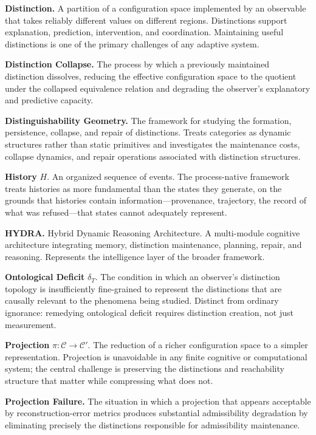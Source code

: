 \documentclass[11pt, oneside]{book}
\theoremstyle{definition}
\theoremstyle{remark}
\begin{document}
\textbf{Distinction.} A partition of a configuration space implemented by an observable that takes reliably different values on different regions. Distinctions support explanation, prediction, intervention, and coordination. Maintaining useful distinctions is one of the primary challenges of any adaptive system.

\textbf{Distinction Collapse.} The process by which a previously maintained distinction dissolves, reducing the effective configuration space to the quotient under the collapsed equivalence relation and degrading the observer's explanatory and predictive capacity.

\textbf{Distinguishability Geometry.} The framework for studying the formation, persistence, collapse, and repair of distinctions. Treats categories as dynamic structures rather than static primitives and investigates the maintenance costs, collapse dynamics, and repair operations associated with distinction structures.

\textbf{History} $H$. An organized sequence of events. The process-native framework treats histories as more fundamental than the states they generate, on the grounds that histories contain information—provenance, trajectory, the record of what was refused—that states cannot adequately represent.

\textbf{HYDRA.} Hybrid Dynamic Reasoning Architecture. A multi-module cognitive architecture integrating memory, distinction maintenance, planning, repair, and reasoning. Represents the intelligence layer of the broader framework.

\textbf{Ontological Deficit} $\delta_T$. The condition in which an observer's distinction topology is insufficiently fine-grained to represent the distinctions that are causally relevant to the phenomena being studied. Distinct from ordinary ignorance: remedying ontological deficit requires distinction creation, not just measurement.

\textbf{Projection} $\pi : \mathcal{C} \to \mathcal{C}'$. The reduction of a richer configuration space to a simpler representation. Projection is unavoidable in any finite cognitive or computational system; the central challenge is preserving the distinctions and reachability structure that matter while compressing what does not.

\textbf{Projection Failure.} The situation in which a projection that appears acceptable by reconstruction-error metrics produces substantial admissibility degradation by eliminating precisely the distinctions responsible for admissibility maintenance.
\end{document}
